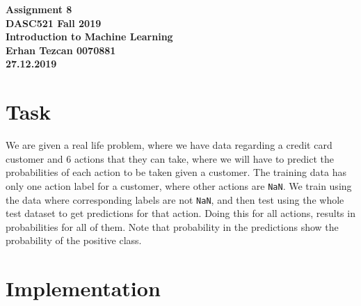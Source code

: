 \documentclass[11pt,reqno]{amsart}
\newcommand{\code}[1]{\texttt{#1}}
\begin{document}
\begin{center}
\large\textbf{Assignment 8 \\ DASC521 Fall 2019} \\
\normalsize\textbf{Introduction to Machine Learning \\  Erhan Tezcan 0070881 \\ 27.12.2019} \\
\end{center}

\section{Task}
We are given a real life problem, where we have data regarding a credit card customer and 6 actions that they can take, where we will have to predict the probabilities of each action to be taken given a customer. The training data has only one action label for a customer, where other actions are \code{NaN}. We train using the data where corresponding labels are not \code{NaN}, and then test using the whole test dataset to get predictions for that action. Doing this for all actions, results in probabilities for all of them. Note that probability in the predictions show the probability of the positive class.

\section{Implementation}
\end{document}
